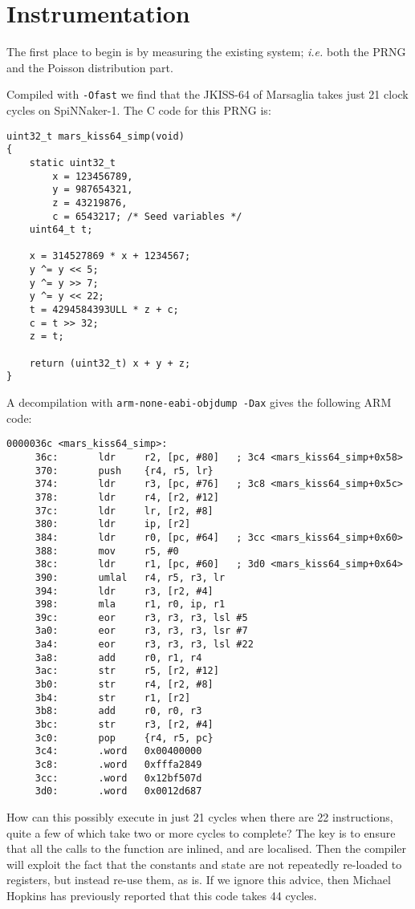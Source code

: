 \section{Instrumentation}

The first place to begin is by measuring the existing system; {\it
  i.e.} both the PRNG and the Poisson distribution part.

Compiled with {\tt -Ofast} we find that the JKISS-64 of Marsaglia
takes just 21 clock cycles on SpiNNaker-1. The C code for this PRNG
is:
\begin{verbatim}
uint32_t mars_kiss64_simp(void)
{
    static uint32_t
        x = 123456789,
        y = 987654321,
        z = 43219876,
        c = 6543217; /* Seed variables */
    uint64_t t;

    x = 314527869 * x + 1234567;
    y ^= y << 5;
    y ^= y >> 7;
    y ^= y << 22;
    t = 4294584393ULL * z + c;
    c = t >> 32;
    z = t;

    return (uint32_t) x + y + z;
}
\end{verbatim}
A decompilation with
{\tt arm-none-eabi-objdump -Dax} gives the following ARM code:
\begin{verbatim}
0000036c <mars_kiss64_simp>:
     36c:       ldr     r2, [pc, #80]   ; 3c4 <mars_kiss64_simp+0x58>
     370:       push    {r4, r5, lr}
     374:       ldr     r3, [pc, #76]   ; 3c8 <mars_kiss64_simp+0x5c>
     378:       ldr     r4, [r2, #12]
     37c:       ldr     lr, [r2, #8]
     380:       ldr     ip, [r2]
     384:       ldr     r0, [pc, #64]   ; 3cc <mars_kiss64_simp+0x60>
     388:       mov     r5, #0
     38c:       ldr     r1, [pc, #60]   ; 3d0 <mars_kiss64_simp+0x64>
     390:       umlal   r4, r5, r3, lr
     394:       ldr     r3, [r2, #4]
     398:       mla     r1, r0, ip, r1
     39c:       eor     r3, r3, r3, lsl #5
     3a0:       eor     r3, r3, r3, lsr #7
     3a4:       eor     r3, r3, r3, lsl #22
     3a8:       add     r0, r1, r4
     3ac:       str     r5, [r2, #12]
     3b0:       str     r4, [r2, #8]
     3b4:       str     r1, [r2]
     3b8:       add     r0, r0, r3
     3bc:       str     r3, [r2, #4]
     3c0:       pop     {r4, r5, pc}
     3c4:       .word   0x00400000
     3c8:       .word   0xfffa2849
     3cc:       .word   0x12bf507d
     3d0:       .word   0x0012d687
\end{verbatim}

How can this possibly execute in just 21 cycles when there are 22
instructions, quite a few of which take two or more cycles to
complete? The key is to ensure that all the calls to the function are
inlined, and are localised. Then the compiler will exploit the fact
that the constants and state are not repeatedly re-loaded to
registers, but instead re-use them, as is. If we ignore this advice,
then Michael Hopkins has previously reported that this code takes 44
cycles.

